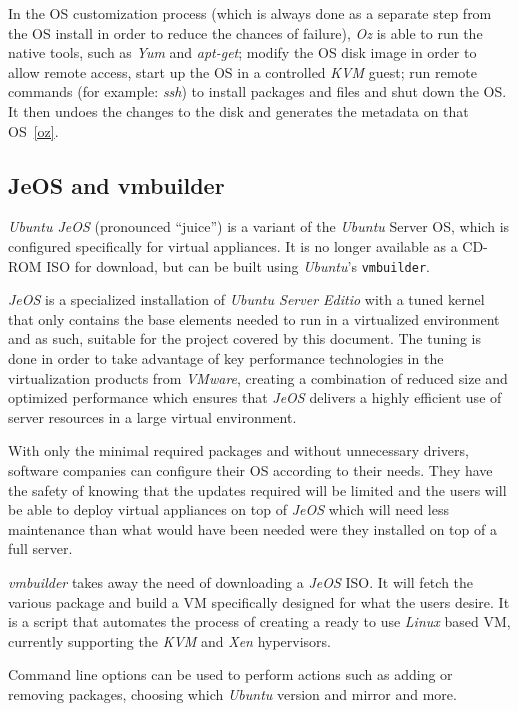 In the OS customization process (which is always done as a separate step from the OS install in order to reduce the chances of failure), \textit{Oz} is able to run the native tools, such as \textit{Yum} and \textit{apt-get}; modify the OS disk image in order to allow remote access, start up the OS in a controlled \textit{KVM} guest; run remote commands (for example: \textit{ssh}) to install packages and files and shut down the OS. It then undoes the changes to the disk and generates the metadata on that OS~\ref{oz}.

\subsection{JeOS and vmbuilder}\label{subsec:vmbuilder}

\textit{Ubuntu JeOS} (pronounced ``juice'') is a variant of the \textit{Ubuntu} Server OS, which is configured specifically for virtual appliances. It is no longer available as a CD-ROM ISO for download, but can be built using \textit{Ubuntu}'s \texttt{vmbuilder}. 

\textit{JeOS} is a specialized installation of \textit{Ubuntu Server Editio} with a tuned kernel that only contains the base elements needed to run in a virtualized environment and as such, suitable for the project covered by this document. The tuning is done in order to take advantage of key performance technologies in the virtualization products from \textit{VMware}, creating a combination of reduced size and optimized performance which ensures that \textit{JeOS} delivers a highly efficient use of server resources in a large virtual environment.

With only the minimal required packages and without unnecessary drivers, software companies can configure their OS according to their needs. They have the safety of knowing that the updates required will be limited and the users will be able to deploy virtual appliances on top of \textit{JeOS} which will need less maintenance than what would have been needed were they installed on top of a full server.

\textit{vmbuilder} takes away the need of downloading a \textit{JeOS} ISO. It will fetch the various package and build a VM specifically designed for what the users desire. It is a script that automates the process of creating a ready to use \textit{Linux} based VM, currently supporting the \textit{KVM} and \textit{Xen} hypervisors.

Command line options can be used to perform actions such as adding or removing packages, choosing which \textit{Ubuntu} version and mirror and more.

